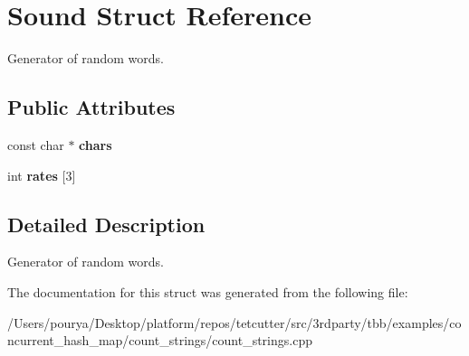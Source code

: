 \hypertarget{structSound}{}\section{Sound Struct Reference}
\label{structSound}


Generator of random words.  


\subsection*{Public Attributes}
\begin{DoxyCompactItemize}
\item 
\hypertarget{structSound_a5891b6f9882d5496ec3d810b81f677ea}{}const char $\ast$ {\bfseries chars}\label{structSound_a5891b6f9882d5496ec3d810b81f677ea}

\item 
\hypertarget{structSound_a368d7cdc4233d60976c5160c7f343545}{}int {\bfseries rates} \mbox{[}3\mbox{]}\label{structSound_a368d7cdc4233d60976c5160c7f343545}

\end{DoxyCompactItemize}


\subsection{Detailed Description}
Generator of random words. 

The documentation for this struct was generated from the following file\+:\begin{DoxyCompactItemize}
\item 
/\+Users/pourya/\+Desktop/platform/repos/tetcutter/src/3rdparty/tbb/examples/concurrent\+\_\+hash\+\_\+map/count\+\_\+strings/count\+\_\+strings.\+cpp\end{DoxyCompactItemize}
